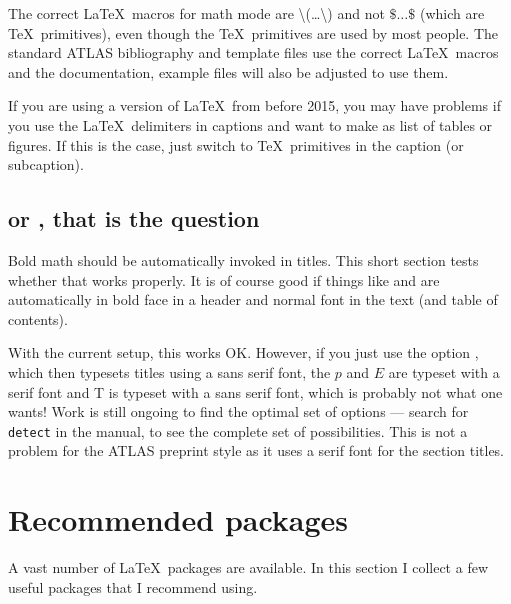 The correct \LaTeX\ macros for math mode are \textbackslash(\ldots\textbackslash)
and not \(\$\ldots\$\) (which are \TeX\ primitives),
even though the \TeX\ primitives are used by most people.
 The standard ATLAS bibliography and template files use the correct \LaTeX\ macros and
the documentation, example files will also be adjusted to use them.

If you are using a version of \LaTeX\ from before 2015, you may have problems
if you use the \LaTeX\ delimiters in captions and want to make as list of tables or figures.
If this is the case, just switch to \TeX\ primitives in the caption (or subcaption).


\subsection{\pT or \ET, that is the question}

Bold math should be automatically invoked in titles.
This short section tests whether that works properly.
It is of course good if things like \pT and \ET are automatically in bold face in
a header and normal font in the text (and table of contents).

With the current setup, this works OK. 
However, if you just use the option , which then typesets titles using a sans serif font,
the $p$ and $E$ are typeset with a serif font and \textsf{T} is typeset with a sans serif font,
which is probably not what one wants!
Work is still ongoing to find the optimal set of options
--- search for \texttt{detect} in the  manual, to see the complete set of possibilities.
This is not a problem for the ATLAS preprint style as it uses a serif font for the section titles.


\section{Recommended packages}

A vast number of \LaTeX\ packages are available.
In this section I collect a few useful packages that I recommend using.

